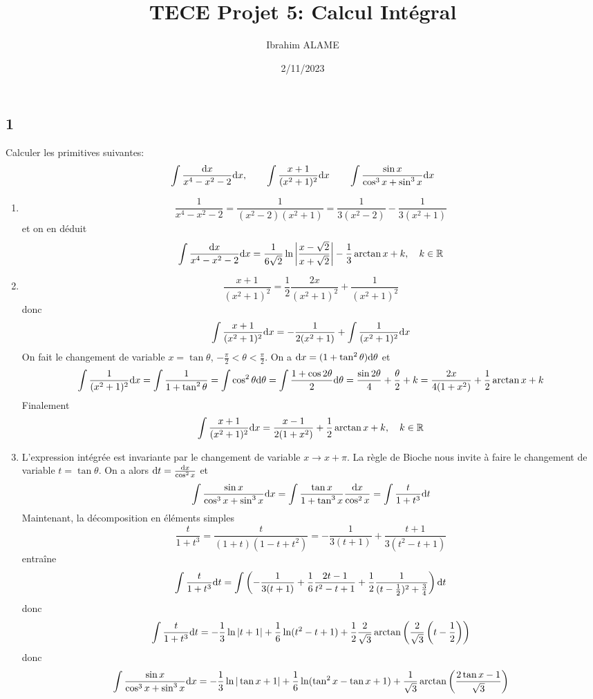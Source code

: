 \documentclass{article}[11pt]
\title{TECE Projet 5: Calcul Intégral}
\author{Ibrahim ALAME}
\date{2/11/2023}
\def \de {{\rm d}}
\begin{document}
\maketitle
\subsection*{1}
{\color{blue}
Calculer les primitives suivantes:
\[\int \frac{\de x}{x^4 -x^2-2}\de x,\qquad \int \frac{x+1}{(x^2+1)^2}\de x\qquad \int \frac{\sin x}{\cos^3x+\sin^3x}\de x\]
}
\begin{enumerate}
\item \[\frac{1}{x^4 -x^2-2}=\frac{1}{(x^2 -2)(x^2+1)}=\frac{1}{3(x^2-2)}-\frac{1}{3(x^2+1)}\]
et on en déduit
\[\int \frac{\de x}{x^4 -x^2-2}\de x=\frac{1}{6\sqrt 2}\ln\left|\frac{x-\sqrt 2}{x+\sqrt 2}\right|-\frac 13 \arctan x +k,\quad k\in\mathbb{R}\]
\item \[\frac{x+1}{(x^2+1)^2}=\frac 12\frac{2x}{(x^2+1)^2}+\frac{1}{(x^2+1)^2}\]
donc
\[\int \frac{x+1}{(x^2+1)^2}\de x=-\frac{1}{2(x^2+1)}+\int \frac{1}{(x^2+1)^2}\de x\]
On fait le changement de variable $x=\tan\theta$, $-\frac{\pi}{2}<\theta<\frac{\pi}{2}$. On a $\de x=(1+\tan^2\theta)\de \theta$ et
\[\int \frac{1}{(x^2+1)^2}\de x=\int\frac{1}{1+\tan^2\theta}=\int\cos^2\theta\de\theta=\int\frac{1+\cos 2\theta}{2}\de\theta=\frac{\sin 2\theta}{4}+\frac{\theta}{2}+k=\frac{2x}{4(1+x^2)}+\frac 12\arctan x+k\]
Finalement
\[\int \frac{x+1}{(x^2+1)^2}\de x=\frac{x-1}{2(1+x^2)}+\frac 12\arctan x+k,\quad k\in\mathbb{R}\]
\item L'expression intégrée est invariante par le changement de variable $x\to x+\pi$. La règle de Bioche nous invite à faire le changement de variable $t=\tan\theta$. On a alors $\de t=\frac{\de x}{\cos^2x}$ et
\[\int \frac{\sin x}{\cos^3x+\sin^3x}\de x=\int\frac{\tan x}{1+\tan^3x}\frac{\de x}{\cos^2x}=\int\frac{t}{1+t^3}\de t\]
Maintenant, la décomposition en éléments simples
\[\frac{t}{1+t^3}=\frac{t}{(1+t)(1-t+t^2)}=-\frac{1}{3(t+1)}+\frac{t+1}{3(t^2-t+1)}\]
entraîne
\[\int\frac{t}{1+t^3}\de t=\int\left(-\frac{1}{3(t+1)}+\frac 16\frac{2t-1}{t^2-t+1}+\frac 12\frac{1}{(t-\frac 12)^2+\frac 34}\right)\de t\]
donc
\[\int\frac{t}{1+t^3}\de t=-\frac{1}{3}\ln|t+1|+\frac 16\ln(t^2-t+1)+\frac 12\frac{2}{\sqrt 3}\arctan\left(\frac{2}{\sqrt 3} \left(t-\frac 12\right)\right)\]
donc
\[\int \frac{\sin x}{\cos^3x+\sin^3x}\de x=-\frac{1}{3}\ln|\tan x+1|+\frac 16\ln(\tan^2x-\tan x+1)+\frac{1}{\sqrt 3}\arctan\left(\frac{2\tan x-1}{\sqrt 3} \right)\]
\end{enumerate}
\end{document}
